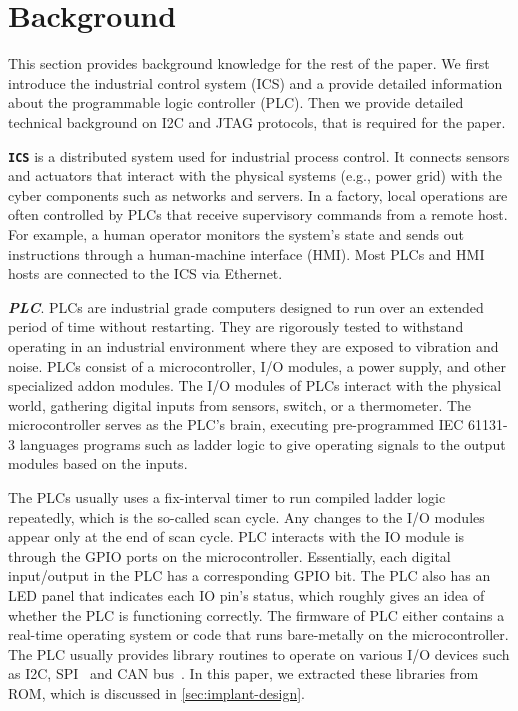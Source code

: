 \section{Background}
\label{sec:implant-background}

This section provides background knowledge for the rest of the paper. We first introduce the industrial control system (ICS) and a provide detailed information about the programmable logic controller (PLC). Then we provide detailed technical background on I2C and JTAG protocols, that is required for the paper.

\textbf{\texttt{ICS}} is a distributed system used for industrial process control. It connects sensors and actuators that interact with the physical systems (e.g., power grid) with the cyber components such as networks and servers. In a factory, local operations are often controlled by PLCs that receive supervisory commands from a remote host. For example, a human operator monitors the system's state and sends out instructions through a human-machine interface (HMI). Most PLCs and HMI hosts are connected to the ICS via Ethernet.

\textbf{\textit{PLC}}. PLCs are industrial grade computers designed to run over an extended period of time without restarting. They are rigorously tested to withstand operating in an industrial environment where they are exposed to vibration and noise. PLCs consist of a microcontroller, I/O modules, a power supply, and other specialized addon modules. The I/O modules of PLCs interact with the physical world, gathering digital inputs from sensors, switch, or a thermometer. The microcontroller serves as the PLC's brain, executing pre-programmed IEC 61131-3 languages programs such as ladder logic to give operating signals to the output modules based on the inputs. 

The PLCs usually uses a fix-interval timer to run compiled ladder logic repeatedly, which is the so-called scan cycle. Any changes to the I/O modules appear only at the end of scan cycle. PLC interacts with the IO module is through the GPIO ports on the microcontroller. Essentially, each digital input/output in the PLC has a corresponding GPIO bit. The PLC also has an LED panel that indicates each IO pin's status, which roughly gives an idea of whether the PLC is functioning correctly. The firmware of PLC either contains a real-time operating system or code that runs bare-metally on the microcontroller. The PLC usually provides library routines to operate on various I/O devices such as I2C, SPI~\cite{leens2009introduction} and CAN bus~\cite{bozdal2018survey}. In this paper, we extracted these libraries from ROM, which is discussed in  \autoref{sec:implant-design}.

